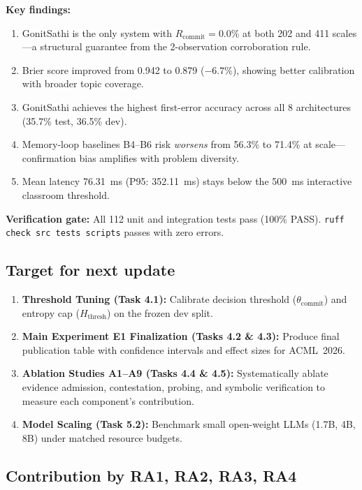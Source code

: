 \documentclass[lettersize,onecolumn,journal]{IEEEtran}
\begin{document}
\begin{itemize}
\noindent \textbf{Key findings:}
\begin{enumerate}
    \item GonitSathi is the only system with $R_{\text{commit}} = 0.0\%$ at both 202 and 411 scales---a structural guarantee from the 2-observation corroboration rule.
    \item Brier score improved from 0.942 to 0.879 ($-6.7\%$), showing better calibration with broader topic coverage.
    \item GonitSathi achieves the highest first-error accuracy across all 8 architectures (35.7\% test, 36.5\% dev).
    \item Memory-loop baselines B4--B6 risk \textit{worsens} from 56.3\% to 71.4\% at scale---confirmation bias amplifies with problem diversity.
    \item Mean latency 76.31~ms (P95: 352.11~ms) stays below the 500~ms interactive classroom threshold.
\end{enumerate}

\noindent\textbf{Verification gate:} All 112 unit and integration tests pass (100\% PASS). \texttt{ruff check src tests scripts} passes with zero errors.

\end{itemize}

\subsection{Target for next update}

\begin{enumerate}
    \item \textbf{Threshold Tuning (Task 4.1):} Calibrate decision threshold ($\theta_{\text{commit}}$) and entropy cap ($H_{\text{thresh}}$) on the frozen dev split.
    \item \textbf{Main Experiment E1 Finalization (Tasks 4.2 \& 4.3):} Produce final publication table with confidence intervals and effect sizes for ACML~2026.
    \item \textbf{Ablation Studies A1--A9 (Tasks 4.4 \& 4.5):} Systematically ablate evidence admission, contestation, probing, and symbolic verification to measure each component's contribution.
    \item \textbf{Model Scaling (Task 5.2):} Benchmark small open-weight LLMs (1.7B, 4B, 8B) under matched resource budgets.
\end{enumerate}

\subsection{Contribution by RA1, RA2, RA3, RA4}
\end{document}

